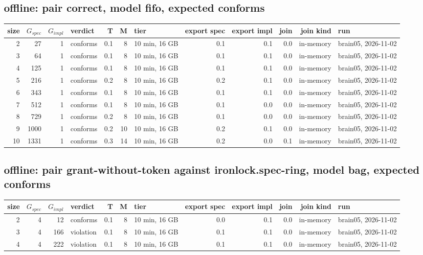 \documentclass[10pt]{article}
\begin{document}
\subsection*{offline: pair \textsf{correct}, model fifo, expected conforms}
\begin{longtable}{@{}rrrlrrlrrrrl@{}}
\toprule
size & $G_{\mathit{spec}}$ & $G_{\mathit{impl}}$ & verdict & T & M & tier & export spec & export impl & join & join kind & run \\
\midrule
\endhead
\color{red} 2 & 27 & 1 & conforms & 0.1 & 8 & 10 min, 16 GB & 0.1 & 0.1 & 0.0 & in-memory & brain05, 2026-11-02 \\
\color{red} 3 & 64 & 1 & conforms & 0.1 & 8 & 10 min, 16 GB & 0.1 & 0.1 & 0.0 & in-memory & brain05, 2026-11-02 \\
\color{red} 4 & 125 & 1 & conforms & 0.1 & 8 & 10 min, 16 GB & 0.1 & 0.1 & 0.0 & in-memory & brain05, 2026-11-02 \\
\color{red} 5 & 216 & 1 & conforms & 0.2 & 8 & 10 min, 16 GB & 0.2 & 0.1 & 0.0 & in-memory & brain05, 2026-11-02 \\
\color{red} 6 & 343 & 1 & conforms & 0.1 & 8 & 10 min, 16 GB & 0.1 & 0.1 & 0.0 & in-memory & brain05, 2026-11-02 \\
\color{red} 7 & 512 & 1 & conforms & 0.1 & 8 & 10 min, 16 GB & 0.1 & 0.0 & 0.0 & in-memory & brain05, 2026-11-02 \\
\color{red} 8 & 729 & 1 & conforms & 0.2 & 8 & 10 min, 16 GB & 0.1 & 0.0 & 0.0 & in-memory & brain05, 2026-11-02 \\
\color{red} 9 & 1000 & 1 & conforms & 0.2 & 10 & 10 min, 16 GB & 0.2 & 0.1 & 0.0 & in-memory & brain05, 2026-11-02 \\
\color{red} 10 & 1331 & 1 & conforms & 0.3 & 14 & 10 min, 16 GB & 0.2 & 0.0 & 0.1 & in-memory & brain05, 2026-11-02 \\
\bottomrule
\end{longtable}
\subsection*{offline: pair \textsf{grant-without-token} against \textsf{ironlock.spec-ring}, model bag, expected conforms}
\begin{longtable}{@{}rrrlrrlrrrrl@{}}
\toprule
size & $G_{\mathit{spec}}$ & $G_{\mathit{impl}}$ & verdict & T & M & tier & export spec & export impl & join & join kind & run \\
\midrule
\endhead
\color{red} 2 & 4 & 12 & conforms & 0.1 & 8 & 10 min, 16 GB & 0.0 & 0.1 & 0.0 & in-memory & brain05, 2026-11-02 \\
\color{red} 3 & 4 & 166 & violation & 0.1 & 8 & 10 min, 16 GB & 0.1 & 0.1 & 0.0 & in-memory & brain05, 2026-11-02 \\
\color{red} 4 & 4 & 222 & violation & 0.1 & 8 & 10 min, 16 GB & 0.1 & 0.1 & 0.0 & in-memory & brain05, 2026-11-02 \\
\bottomrule
\end{longtable}
\end{document}
